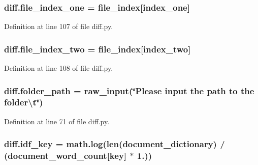 \subsubsection[{\texorpdfstring{file\+\_\+index\+\_\+one}{file_index_one}}]{\setlength{\rightskip}{0pt plus 5cm}diff.\+file\+\_\+index\+\_\+one = {\bf file\+\_\+index}\mbox{[}index\+\_\+one\mbox{]}}\hypertarget{namespacediff_ac8ee8a35e457d5004c0f85b0383faf26}{}\label{namespacediff_ac8ee8a35e457d5004c0f85b0383faf26}


Definition at line 107 of file diff.\+py.

\subsubsection[{\texorpdfstring{file\+\_\+index\+\_\+two}{file_index_two}}]{\setlength{\rightskip}{0pt plus 5cm}diff.\+file\+\_\+index\+\_\+two = {\bf file\+\_\+index}\mbox{[}index\+\_\+two\mbox{]}}\hypertarget{namespacediff_a6f1ee631f8bf5af8ef567c3e029b0e6b}{}\label{namespacediff_a6f1ee631f8bf5af8ef567c3e029b0e6b}


Definition at line 108 of file diff.\+py.

\subsubsection[{\texorpdfstring{folder\+\_\+path}{folder_path}}]{\setlength{\rightskip}{0pt plus 5cm}diff.\+folder\+\_\+path = raw\+\_\+input(\char`\"{}Please input the path to the folder\textbackslash{}t\char`\"{})}\hypertarget{namespacediff_adccd64c100d50ed0e87d46c33e8636eb}{}\label{namespacediff_adccd64c100d50ed0e87d46c33e8636eb}


Definition at line 71 of file diff.\+py.

\subsubsection[{\texorpdfstring{idf\+\_\+key}{idf_key}}]{\setlength{\rightskip}{0pt plus 5cm}diff.\+idf\+\_\+key = math.\+log(len({\bf document\+\_\+dictionary}) / ({\bf document\+\_\+word\+\_\+count}\mbox{[}key\mbox{]} $\ast$ 1.))}\hypertarget{namespacediff_a1798972d3d6361a79c16d8470bf3471d}{}\label{namespacediff_a1798972d3d6361a79c16d8470bf3471d}



